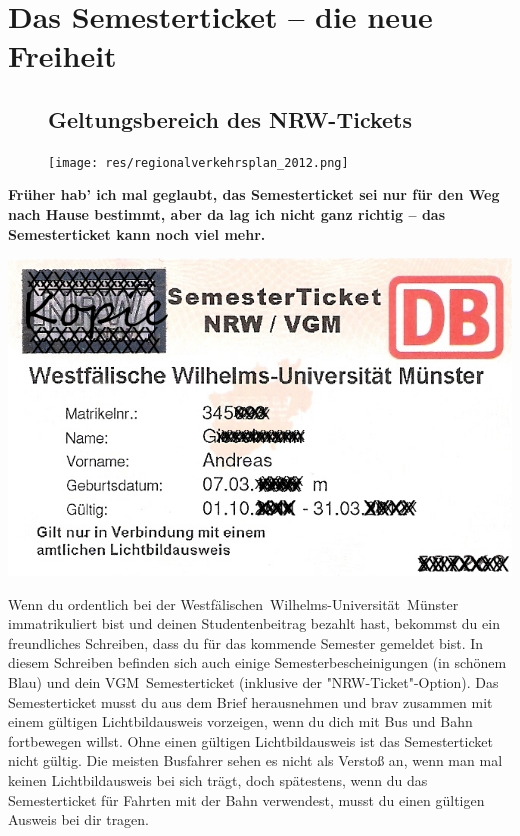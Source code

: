 \section{Das Semesterticket -- die neue Freiheit}

\begin{center}
\end{center}
\begin{multicols}{2}
\begin{figure}[t]
\subsection*{Geltungsbereich des NRW-Tickets}
\texttt{[image: res/regionalverkehrsplan\_2012.png]}
\end{figure}
\textbf{Früher hab' ich mal geglaubt, das Semesterticket sei nur für den Weg nach Hause bestimmt, aber da lag ich nicht ganz richtig -- das Semesterticket kann noch viel mehr.}

\includegraphics[width=\columnwidth]{res/semesterticket.png}

Wenn du ordentlich bei der Westfälischen~Wilhelms-Universität~Münster immatrikuliert bist und deinen Studentenbeitrag bezahlt hast, bekommst du ein freundliches Schreiben, dass du für das kommende Semester gemeldet bist. In diesem Schreiben befinden sich auch einige Semesterbescheinigungen (in schönem Blau) und dein VGM~Semesterticket (inklusive der "NRW-Ticket"-Option). Das Semesterticket musst du aus dem Brief herausnehmen und brav zusammen mit einem gültigen Lichtbildausweis vorzeigen, wenn du dich mit Bus und Bahn fortbewegen willst. Ohne einen gültigen Lichtbildausweis ist das Semesterticket nicht gültig. Die meisten Busfahrer sehen es nicht als Verstoß an, wenn man mal keinen Lichtbildausweis bei sich trägt, doch spätestens, wenn du das Semesterticket für Fahrten mit der Bahn verwendest, musst du einen gültigen Ausweis bei dir tragen.


\end{multicols}
